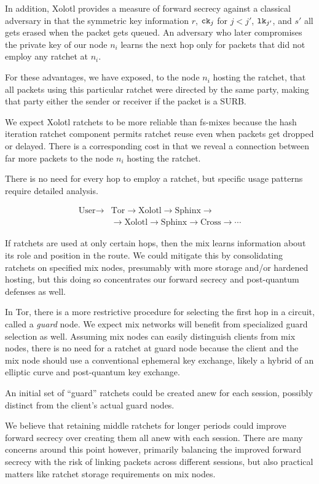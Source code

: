 \documentclass[twoside,letterpaper]{llncs}
\begin{document}
In addition, Xolotl provides a measure of forward secrecy against
a classical adversary in that the symmetric key information $r$,
$\texttt{ck}_j$ for $j<j'$, $\texttt{lk}_{j'}$, and $s'$ all gets erased when
the packet gets queued.  An adversary who later compromises the
private key of our node $n_i$ learns the next hop only for packets
that did not employ any ratchet at $n_i$.

For these advantages, we have exposed,
 to the node $n_i$ hosting the ratchet, that all packets using this
particular ratchet were directed by the same party, making that
party either the sender or receiver if the packet is a SURB.

We expect Xolotl ratchets to be more reliable than fs-mixes because
the hash iteration ratchet component permits ratchet reuse even when
packets get dropped or delayed.  There is a corresponding cost in
that we reveal a connection between far more packets to the node
$n_i$ hosting the ratchet.

There is no need for every hop to employ a ratchet, %
but specific usage patterns require detailed analysis.

\[ \begin{aligned}
\textrm{User} \to &\textrm{Tor} \to \textrm{Xolotl} \to \textrm{Sphinx} \to \\
\quad &\to \textrm{Xolotl} \to \textrm{Sphinx} \to \textrm{Cross} \to \cdots 
\end{aligned} \]

If ratchets are used at only certain hops, then the mix learns
information about its role and position in the route.  
We could mitigate this by consolidating ratchets on specified mix
nodes, presumably with more storage and/or hardened hosting, but
this doing so concentrates our forward secrecy and post-quantum 
defenses as well.

In Tor, there is a more restrictive procedure for selecting the
first hop in a circuit, called a {\it guard} node.  We expect
mix networks will benefit from specialized guard selection as well.
Assuming mix nodes can easily distinguish clients from mix nodes,
there is no need for a ratchet at guard node because the client and
the mix node should use a conventional ephemeral key exchange,
likely a hybrid of an elliptic curve and post-quantum key exchange.

An initial set of ``guard'' ratchets could be created anew for each
session, possibly distinct from the client's actual guard nodes.

We believe that retaining middle ratchets for longer periods could
improve forward secrecy over creating them all anew with each session. 
There are many concerns around this point however, primarily balancing
the improved forward secrecy with the risk of linking packets across
different sessions, but also
 practical matters like ratchet storage requirements on mix nodes.  
\end{document}
